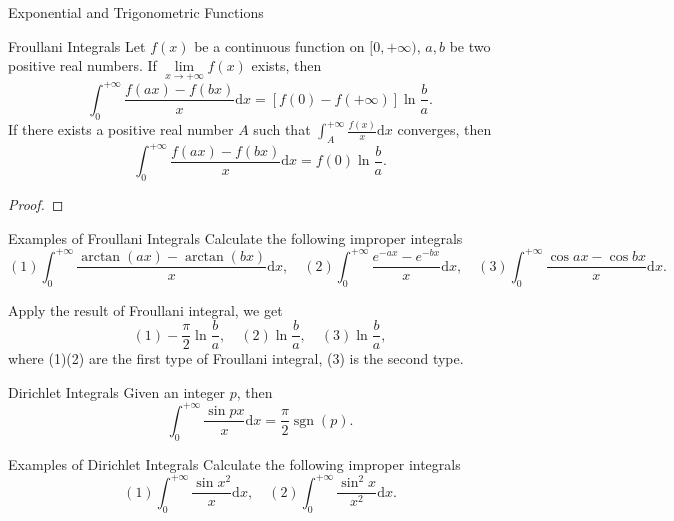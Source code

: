 \begin{example}{Exponential and Trigonometric Functions}{}
  
\end{example}

\begin{theorem}{Froullani Integrals}{}
  Let $f(x)$ be a continuous function on $[0, +\infty)$,
  $a, b$ be two positive real numbers.
  If $\lim \limits _{x \rightarrow +\infty}f(x)$ exists, then
  \begin{equation}
    \int_0^{+\infty} \frac{f(ax) - f(bx)}{x}\mathrm{d} x
    = [f(0) - f(+\infty)] \ln \frac{b}{a}.
  \end{equation}
  If there exists a positive real number $A$ such that
  $\int_A^{+\infty} \frac{f(x)}{x}\mathrm{d} x$ converges, then
  \begin{equation}
    \int_0^{+\infty} \frac{f(ax) - f(bx)}{x}\mathrm{d} x
    = f(0) \ln \frac{b}{a}.
  \end{equation}
\end{theorem}

\begin{proof}
  
\end{proof}

\begin{example}{Examples of Froullani Integrals}{}
  Calculate the following improper integrals
  \begin{equation}
    (1) \int_0^{+\infty} \frac{\arctan(ax) - \arctan(bx)}{x}\mathrm{d} x, \quad
    (2) \int_0^{+\infty} \frac{e^{-ax} - e^{-bx}}{x}\mathrm{d} x, \quad
    (3) \int_0^{+\infty} \frac{\cos ax - \cos bx}{x} \mathrm{d} x.
  \end{equation}
\end{example}

\begin{solution}
  Apply the result of Froullani integral, we get 
  \begin{equation}
    (1) - \frac{\pi}{2} \ln \frac{b}{a}, \quad
    (2) \ln \frac{b}{a}, \quad
    (3) \ln \frac{b}{a},
  \end{equation}
  where (1)(2) are the first type of Froullani integral,
  (3) is the second type.
\end{solution}

\begin{proposition}{}{}
  
\end{proposition}

\begin{theorem}{Dirichlet Integrals}{}
  Given an integer $p$, then
  \begin{equation}
    \int_0^{+\infty} \frac{\sin px}{x} \mathrm{d} x= \frac{\pi}{2} \operatorname{sgn}(p).
  \end{equation}
\end{theorem}

\begin{example}{Examples of Dirichlet Integrals}{}
  Calculate the following improper integrals
  \begin{equation}
    (1) \int_0^{+\infty} \frac{\sin x^2}{x}\mathrm{d} x, \quad
    (2) \int_0^{+\infty} \frac{\sin^2 x}{x^2} \mathrm{d} x.
  \end{equation}
\end{example}







